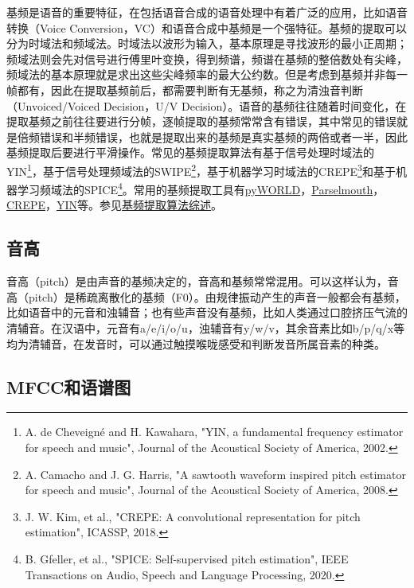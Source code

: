 \documentclass[cn,10pt,math=newtx,citestyle=gb7714-2015,bibstyle=gb7714-2015]{elegantbook}
\begin{document}
基频是语音的重要特征，在包括语音合成的语音处理中有着广泛的应用，比如语音转换（Voice Conversion，VC）和语音合成中基频是一个强特征。基频的提取可以分为时域法和频域法。时域法以波形为输入，基本原理是寻找波形的最小正周期；频域法则会先对信号进行傅里叶变换，得到频谱，频谱在基频的整倍数处有尖峰，频域法的基本原理就是求出这些尖峰频率的最大公约数。但是考虑到基频并非每一帧都有，因此在提取基频前后，都需要判断有无基频，称之为清浊音判断（Unvoiced/Voiced Decision，U/V Decision）。语音的基频往往随着时间变化，在提取基频之前往往要进行分帧，逐帧提取的基频常常含有错误，其中常见的错误就是倍频错误和半频错误，也就是提取出来的基频是真实基频的两倍或者一半，因此基频提取后要进行平滑操作。常见的基频提取算法有基于信号处理时域法的YIN\footnote{A. de Cheveigné and H. Kawahara, "YIN, a fundamental frequency estimator for speech and music", Journal of the Acoustical Society of America, 2002.}，基于信号处理频域法的SWIPE\footnote{A. Camacho and J. G. Harris, "A sawtooth waveform inspired pitch estimator for speech and music", Journal of the Acoustical Society of America, 2008.}，基于机器学习时域法的CREPE\footnote{J. W. Kim, et al., "CREPE: A convolutional representation for pitch estimation", ICASSP, 2018.}和基于机器学习频域法的SPICE\footnote{B. Gfeller, et al., "SPICE: Self-supervised pitch estimation", IEEE Transactions on Audio, Speech and Language Processing, 2020.}。常用的基频提取工具有\href{https://github.com/JeremyCCHsu/Python-Wrapper-for-World-Vocoder}{pyWORLD}，\href{https://github.com/YannickJadoul/Parselmouth}{Parselmouth}，\href{https://github.com/marl/crepe}{CREPE}，\href{https://github.com/patriceguyot/Yin}{YIN}等。参见\href{https://zhuanlan.zhihu.com/p/269107205}{基频提取算法综述}。

\subsection{音高}

音高（pitch）是由声音的基频决定的，音高和基频常常混用。可以这样认为，音高（pitch）是稀疏离散化的基频（F0）。由规律振动产生的声音一般都会有基频，比如语音中的元音和浊辅音；也有些声音没有基频，比如人类通过口腔挤压气流的清辅音。在汉语中，元音有a/e/i/o/u，浊辅音有y/w/v，其余音素比如b/p/q/x等均为清辅音，在发音时，可以通过触摸喉咙感受和判断发音所属音素的种类。

\subsection{MFCC和语谱图}
\end{document}
